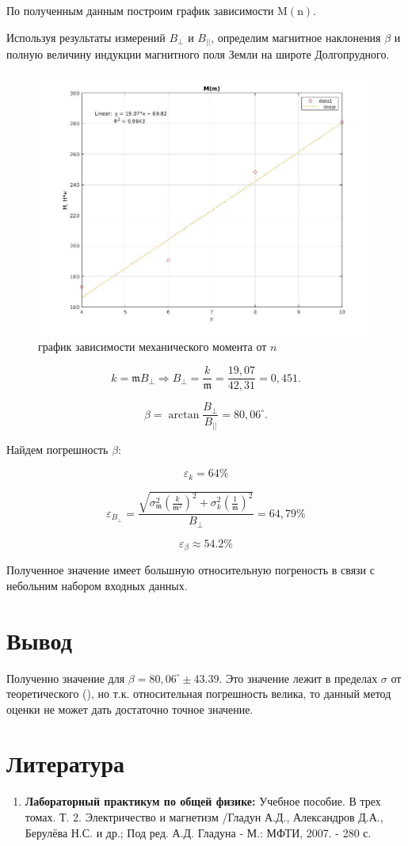 \documentclass[a4paper, 12pt]{article}%
\begin{document}
По полученным данным построим график зависимости $\mathrm{M}(\mathrm{n})$.

Используя результаты измерений $B_{\perp}$ и $B_{||}$, определим магнитное наклонения $\beta$ и полную величину индукции магнитного поля Земли на широте Долгопрудного.

\begin{figure}[h]
    \centering
    \includegraphics[width = 11 cm]{m(n)_big.jpg}
    \caption{график зависимости механического момента от $n$}
    \label{msh1}
\end{figure}

\[ k = \mathfrak{m} B_{\perp} \Rightarrow B_{\perp} = \frac{k}{\mathfrak{m}} = \frac{19,07}{42,31} = 0,451  .\]

\[ \beta = \arctan{\frac{B_{\perp}}{B_{||}}} = 80,06^{\circ} .\]

Найдем погрешность $\beta$:

\[ \varepsilon_{k} = 64\%\]

\[ \varepsilon_{B_{\perp}} = \frac{\sqrt{\sigma^2_{\mathfrak{m}} (\frac{k}{\mathfrak{m}^2})^2 + \sigma^2_k (\frac{1}{\mathfrak{m}})^2}}{B_{\perp}} = 64,79\% \]

\[ \varepsilon_{\beta} \approx 54.2\% \]

Полученное значение имеет большную относительную погреность в связи с небольним набором входных данных.

\section{Вывод}

Полученно значение для $\beta = 80,06^{\circ} \pm 43.39$. Это значение лежит в пределах $\sigma$ от теоретического (), но т.к. относительная погрешность велика, то данный метод оценки не может дать достаточно точное значение.

\section{Литература}

\begin{enumerate}
\item \textbf{Лабораторный практикум по общей физике:} Учебное пособие. В трех томах. Т. 2. Электричество и магнетизм /Гладун А.Д., Александров Д.А., Берулёва Н.С. и др.; Под ред. А.Д. Гладуна - М.: МФТИ, 2007. - 280 с.
\end{enumerate}		
		
\end{document}
